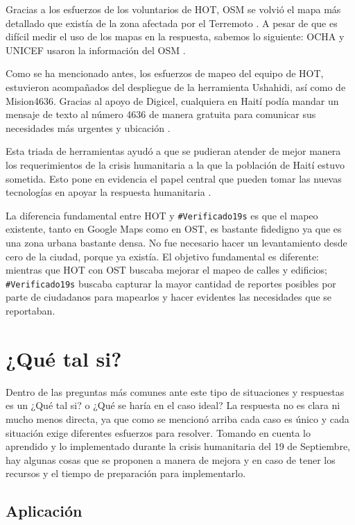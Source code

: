 \documentclass[12pt,spanish,oneside,breaklinks]{book}
\begin{document}
Gracias a los esfuerzos de los voluntarios de HOT, OSM se volvió el mapa más detallado que existía de la zona afectada por el Terremoto \cite{sorden2014}. A pesar de que es difícil medir el uso de los mapas en la respuesta, sabemos lo siguiente: OCHA y UNICEF usaron la información del OSM \cite{batty2010}.

Como se ha mencionado antes,  los esfuerzos de mapeo del equipo de HOT, estuvieron acompañados del despliegue de la herramienta Ushahidi, así como de Mision4636. Gracias al apoyo de Digicel, cualquiera en Haití podía mandar un mensaje de texto al número 4636 de manera gratuita para comunicar sus necesidades más urgentes y ubicación \cite{meier2012}.

Esta triada de herramientas ayudó a que se pudieran atender de mejor manera los requerimientos de la crisis humanitaria a la que la población de Haití estuvo sometida. Esto pone en evidencia el papel central que pueden tomar las nuevas tecnologías en apoyar la respuesta humanitaria \cite{meier2012}.

La diferencia fundamental entre HOT y \texttt{\#Verificado19s}  es que el mapeo existente, tanto en Google Maps como en OST, es bastante fidedigno ya que es una zona urbana bastante densa. No fue necesario hacer un levantamiento desde cero de la ciudad, porque ya existía. El objetivo fundamental es diferente: mientras que HOT con OST buscaba mejorar el mapeo de calles y edificios; \texttt{\#Verificado19s} buscaba capturar la mayor cantidad de reportes posibles por parte de ciudadanos para mapearlos y hacer evidentes las necesidades que se reportaban.

\newpage
\chapter{¿Qué tal si?}
\label{sec:org2c90b8b}

Dentro de las preguntas más comunes ante este tipo de situaciones y respuestas es un ¿Qué tal si? o ¿Qué se haría en el caso ideal? La respuesta no es clara ni mucho menos directa, ya que como se mencionó arriba cada caso es único y cada situación exige diferentes esfuerzos para resolver.  Tomando en cuenta lo aprendido y lo implementado durante la crisis humanitaria del 19 de Septiembre,  hay algunas cosas que se proponen a manera de mejora y en caso de tener los recursos y el tiempo de preparación para implementarlo.

\section{Aplicación}
\label{sec:org780c80a}
\end{document}
